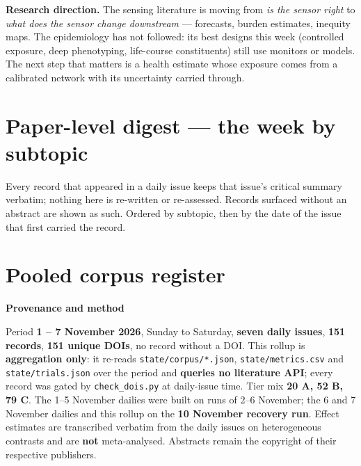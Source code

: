 \documentclass[10pt]{article}
\begin{document}
\vspace{1.5mm}
\textbf{Research direction.} The sensing literature is moving from \emph{is the sensor right} to \emph{what does the
sensor change downstream} --- forecasts, burden estimates, inequity maps. The epidemiology has not followed: its
best designs this week (controlled exposure, deep phenotyping, life-course constituents) still use monitors or
models. The next step that matters is a health estimate whose exposure comes from a calibrated network with its
uncertainty carried through.

\clearpage

\section*{\sffamily\bfseries\color{Deep}Paper-level digest --- the week by subtopic}
\vspace{-1.5mm}{\color{Teal}\rule{\linewidth}{1.1pt}}\vspace{1mm}

{\fontsize{7.4}{9}\selectfont\color{Slate}Every record that appeared in a daily issue
keeps that issue's critical summary verbatim; nothing here is re-written or re-assessed.
Records surfaced without an abstract are shown as such. Ordered by subtopic, then by the
date of the issue that first carried the record.\par}



\section*{\sffamily\bfseries\color{Deep}Pooled corpus register}
\vspace{-1.5mm}{\color{Teal}\rule{\linewidth}{1.1pt}}\vspace{2.5mm}



\vspace{4mm}
\begin{keybox}
{\sffamily\bfseries\footnotesize\color{Deep}Provenance and method}\\[1.2mm]
{\fontsize{7.2}{8.8}\selectfont
Period \textbf{1 -- 7 November 2026}, Sunday to Saturday, \textbf{seven daily issues},
\textbf{151 records}, \textbf{151 unique DOIs}, no record without a DOI. This rollup is
\textbf{aggregation only}: it re-reads \texttt{state/corpus/*.json}, \texttt{state/metrics.csv} and
\texttt{state/trials.json} over the period and \textbf{queries no literature API}; every record was gated by
\texttt{check\_dois.py} at daily-issue time. Tier mix \textbf{20 A, 52 B, 79 C}. The 1--5 November dailies were
built on runs of 2--6 November; the 6 and 7 November dailies and this rollup on the \textbf{10 November recovery
run}. Effect estimates are transcribed verbatim from the daily issues on heterogeneous contrasts and are
\textbf{not} meta-analysed. Abstracts remain the copyright of their respective publishers.\par}
\end{keybox}
\end{document}
